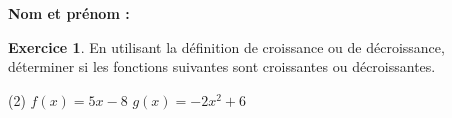 \documentclass{article}
\theoremstyle{definition}
\newtheorem{exercice}{Exercice}
\begin{document}
\pagestyle{fancy}
\fancyhf{} %
\fancyhead[L]{\large \textbf{\Niveau}}
\fancyhead[C]{\large \textbf{\ChapitreCourt}}
\large

\textbf{Nom et prénom :}\dotfill

\begin{exercice}
  En utilisant la définition de croissance ou de décroissance, déterminer si les fonctions suivantes sont croissantes ou décroissantes.
  \begin{tasks}(2)
    \task $f(x)=5x-8$
    \task $g(x)=-2x^2+6$
  \end{tasks}
  \begin{center}
  \end{center}
\end{exercice}
\end{document}
